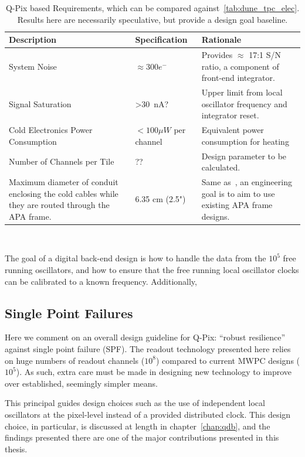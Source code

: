 \begin{table}
\begin{center}
\begin{tabular}{|| p{50mm} | p{50mm} | p{50mm} ||}
 \hline
 Description & Specification & Rationale \\ [0.5ex]
 \hline\hline
  System Noise & $\approx 300 e^{-}$ & Provides $\approx$ 17:1 S/N ratio, a component of front-end integrator. \\
 \hline
  Signal Saturation & >30~\unit{nA}? & Upper limit from local oscillator frequency and integrator reset. \\
 \hline
  Cold Electronics Power Consumption &  $< 100 \unit{\mu W}$ per channel & Equivalent power consumption for heating \\
 \hline
  Number of Channels per Tile & ?? &  Design parameter to be calculated. \\
 \hline
  Maximum diameter of conduit enclosing the cold cables while they are routed through the APA frame. & 6.35 cm (2.5") & Same as~\citep{DUNE-FD_TDRv4:Abi_2020}, an engineering goal is to aim to use existing APA frame designs. \\
 \hline
\end{tabular}
\caption{Q-Pix based Requirements, which can be compared against~\ref{tab:dune_tpc_elec}. Results here are necessarily speculative, but provide a design goal baseline.}
\end{center}
\end{table}~\label{tab:qpix_tpc_elec}

The goal of a digital back-end design is how to handle the data from the $10^{5}$ free running oscillators, and how to ensure that the free running local oscillator clocks can be calibrated to a known frequency.
Additionally,

\subsection{Single Point Failures}

Here we comment on an overall design guideline for Q-Pix: ``robust resilience'' against single point failure (SPF).
The readout technology presented here relies on huge numbers of readout channels ($10^{8}$) compared to current MWPC designs ($10^{5}$).
As such, extra care must be made in designing new technology to improve over established, seemingly simpler means.

This principal guides design choices such as the use of independent local oscillators at the pixel-level instead of a provided distributed clock.
This design choice, in particular, is discussed at length in chapter~\ref{chap:qdb}, and the findings presented there are one of the major contributions presented in this thesis.


